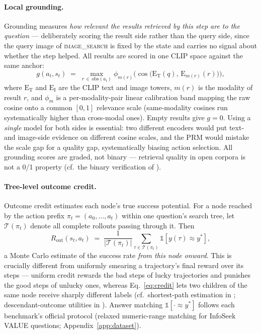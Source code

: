 \documentclass[letterpaper,twocolumn,10pt]{article}
\begin{document}
\paragraph{Local grounding.}
Grounding measures \emph{how relevant the results retrieved by this step
are to the question} --- deliberately scoring the result side rather than
the query side, since the query image of \textsc{image\_search} is fixed by
the state and carries no signal about whether the step helped. All results
are scored in one CLIP space against the same anchor:
\begin{equation}
g(a_t, s_t) \;=\; \max_{r \,\in\, \mathrm{obs}(a_t)}
  \phi_{m(r)}\!\Big( \cos\big( \mathrm{E}_\mathrm{T}(q),\,
  \mathrm{E}_{m(r)}(r) \big) \Big),
\label{eq:grounding}
\end{equation}
where $\mathrm{E}_\mathrm{T}$ and $\mathrm{E}_\mathrm{I}$ are the CLIP text
and image towers, $m(r)$ is the modality of result $r$, and $\phi_m$ is a
per-modality-pair linear calibration band mapping the raw cosine onto a
common $[0,1]$ relevance scale (same-modality cosines run systematically
higher than cross-modal ones). Empty results give $g = 0$. Using a
\emph{single} model for both sides is essential: two different encoders
would put text- and image-side evidence on different cosine scales, and the
PRM would mistake the scale gap for a quality gap, systematically biasing
action selection. All grounding scores are graded, not binary --- retrieval
quality in open corpora is not a 0/1 property (cf.\ the binary verification
of \citealt{groundedprm2025}).

\paragraph{Tree-level outcome credit.}
Outcome credit estimates each node's true success potential. For a node
reached by the action prefix $\pi_t = (a_0, \dots, a_t)$ within one
question's search tree, let $\mathcal{T}(\pi_t)$ denote all complete
rollouts passing through it. Then
\begin{equation}
R_\mathrm{out}(s_t, a_t) \;=\;
\frac{1}{|\mathcal{T}(\pi_t)|} \sum_{\tau \in \mathcal{T}(\pi_t)}
\mathbb{1}\!\left[ y(\tau) \approx y^{*} \right],
\label{eq:credit}
\end{equation}
a Monte Carlo estimate of the success rate \emph{from this node onward}.
This is crucially different from uniformly smearing a trajectory's final
reward over its steps --- uniform credit rewards the bad steps of lucky
trajectories and punishes the good steps of unlucky ones, whereas
Eq.~\eqref{eq:credit} lets two children of the same node receive sharply
different labels (cf.\ shortest-path estimation in
\citealt{zhang2025reasonrag}; descendant-outcome utilities in
\citealt{treeps2026}). Answer matching $\mathbb{1}[\cdot \approx y^{*}]$
follows each benchmark's official protocol (relaxed numeric-range matching
for InfoSeek VALUE questions; Appendix~\ref{app:dataset}).
\end{document}
